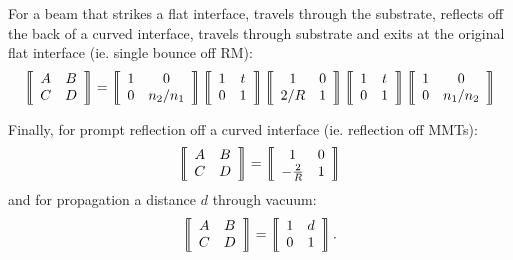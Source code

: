For a beam that strikes a flat interface, travels through the
substrate, reflects off the back of a curved interface, travels
through substrate and exits at the original flat interface (ie. single
bounce off RM):
\begin{equation}
\left\llbracket \begin{array}{c c}
A & B \\
C & D \end{array} \right\rrbracket = 
\left\llbracket \begin{array}{c c}
1 & 0 \\
0 & n_2/n_1 \end{array} \right\rrbracket
\left\llbracket \begin{array}{c c}
1 & t \\
0 & 1 \end{array} \right\rrbracket
\left\llbracket \begin{array}{c c}
1 & 0 \\
2/R & 1 \end{array} \right\rrbracket
\left\llbracket \begin{array}{c c}
1 & t \\
0 & 1 \end{array} \right\rrbracket
\left\llbracket \begin{array}{c c}
1 & 0 \\
0 & n_1/n_2 \end{array} \right\rrbracket
\end{equation}

Finally, for prompt reflection off a curved interface (ie. reflection
off MMTs):
\begin{equation}
\left\llbracket \begin{array}{c c}
A & B \\
C & D \end{array} \right\rrbracket = 
\left\llbracket \begin{array}{c c}
1 & 0 \\
-\frac{2}{R} & 1 \end{array} \right\rrbracket
\end{equation}
and for propagation a distance $d$ through vacuum:
\begin{equation}
\left\llbracket \begin{array}{c c}
A & B \\
C & D \end{array} \right\rrbracket = 
\left\llbracket \begin{array}{c c}
1 & d \\
0 & 1 \end{array} \right\rrbracket.
\end{equation}

